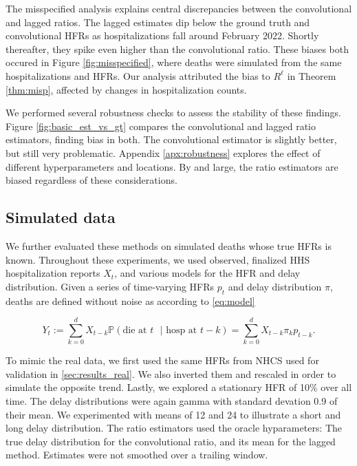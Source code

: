 \documentclass{article}
\begin{document}
The misspecified analysis explains central discrepancies between the convolutional and lagged ratios. The lagged estimates dip below the ground truth and convolutional HFRs as hospitalizations fall around February 2022. Shortly thereafter, they spike even higher than the convolutional ratio. These biases both occured in Figure \ref{fig:misspecified}, where deaths were simulated from the same hospitalizations and HFRs. Our analysis attributed the bias to $R^\ell$ in Theorem \ref{thm:misp}, affected by changes in hospitalization counts.

We performed several robustness checks to assess the stability of these findings. Figure \ref{fig:basic_est_vs_gt} compares the convolutional and lagged ratio estimators, finding bias in both. The convolutional estimator is slightly better, but still very problematic. Appendix \ref{apx:robustness} explores the effect of different hyperparameters and locations. By and large, the ratio estimators are biased regardless of these considerations. 

\subsection{Simulated data}


We further evaluated these methods on simulated deaths whose true HFRs is known. Throughout these experiments, we used observed, finalized HHS hospitalization reports $X_t$, and various models for the HFR and delay distribution. Given a series of time-varying HFRs $p_t$ and delay distribution $\pi$, deaths are defined without noise as according to \ref{eq:model}

$$Y_t := \sum_{k=0}^d X_{t-k} \mathbb{P}(\text{die at $t$ }\vert\text{ hosp at }t-k) = \sum_{k=0}^d X_{t-k} \pi_k p_{t-k}.$$

To mimic the real data, we first used the same HFRs from NHCS used for validation in \ref{sec:results_real}. We also inverted them and rescaled in order to simulate the opposite trend. Lastly, we explored a stationary HFR of 10\% over all time. The delay distributions were again gamma with standard devation 0.9 of their mean. We experimented with means of 12 and 24 to illustrate a short and long delay distribution. The ratio estimators used the oracle hyparameters: The true delay distribution for the convolutional ratio, and its mean for the lagged method. Estimates were not smoothed over a trailing window.
\end{document}
